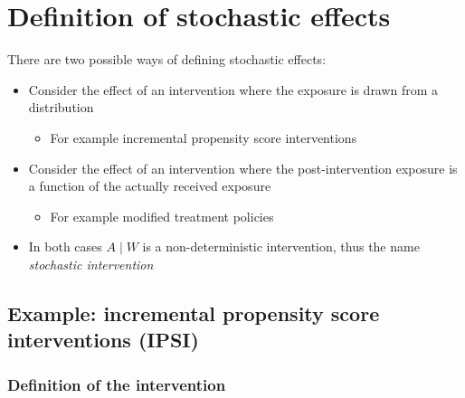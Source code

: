 \documentclass[
  12pt,
]{book}
\providecommand{\tightlist}{%
  \setlength{\itemsep}{0pt}\setlength{\parskip}{0pt}}
\theoremstyle{definition}
\theoremstyle{definition}
\theoremstyle{definition}
\newcommand{\1}{\mathbbm{1}}
\begin{document}
\hypertarget{definition-of-stochastic-effects}{%
\section{Definition of stochastic effects}\label{definition-of-stochastic-effects}}

There are two possible ways of defining stochastic effects:

\begin{itemize}
\tightlist
\item
  Consider the effect of an intervention where the exposure is drawn from a
  distribution

  \begin{itemize}
  \tightlist
  \item
    For example incremental propensity score interventions
  \end{itemize}
\end{itemize}

\begin{itemize}
\tightlist
\item
  Consider the effect of an intervention where the post-intervention exposure is
  a function of the actually received exposure

  \begin{itemize}
  \tightlist
  \item
    For example modified treatment policies
  \end{itemize}
\item
  In both cases \(A \mid W\) is a non-deterministic intervention, thus the name
  \emph{stochastic intervention}
\end{itemize}

\hypertarget{example-incremental-propensity-score-interventions-ipsi-kennedy2018nonparametric}{%
\subsection*{\texorpdfstring{Example: incremental propensity score interventions (IPSI) \citep{kennedy2018nonparametric}}{Example: incremental propensity score interventions (IPSI) {[}@kennedy2018nonparametric{]}}}\label{example-incremental-propensity-score-interventions-ipsi-kennedy2018nonparametric}}


\hypertarget{definition-of-the-intervention}{%
\subsubsection*{Definition of the intervention}\label{definition-of-the-intervention}}
\end{document}
